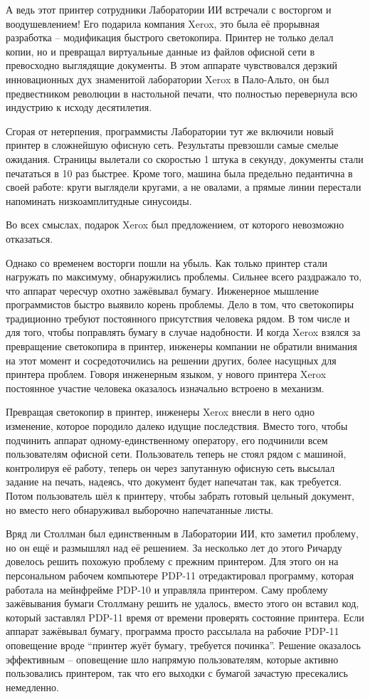 А ведь этот принтер сотрудники Лаборатории ИИ встречали с восторгом и воодушевлением! Его подарила компания Xerox, это была её прорывная разработка -- модификация быстрого светокопира. Принтер не только делал копии, но и превращал виртуальные данные из файлов офисной сети в превосходно выглядящие документы. В этом аппарате чувствовался дерзкий инновационных дух знаменитой лаборатории Xerox в Пало-Альто, он был предвестником революции в настольной печати, что полностью перевернула всю индустрию к исходу десятилетия.

Сгорая от нетерпения, программисты Лаборатории тут же включили новый принтер в сложнейшую офисную сеть. Результаты превзошли самые смелые ожидания. Страницы вылетали со скоростью 1 штука в секунду, документы стали печататься в 10 раз быстрее. Кроме того, машина была предельно педантична в своей работе: круги выглядели кругами, а не овалами, а прямые линии перестали напоминать низкоамплитудные синусоиды.

Во всех смыслах, подарок Xerox был предложением, от которого невозможно отказаться.

Однако со временем восторги пошли на убыль. Как только принтер стали нагружать по максимуму, обнаружились проблемы. Сильнее всего раздражало то, что аппарат чересчур охотно зажёвывал бумагу. Инженерное мышление программистов быстро выявило корень проблемы. Дело в том, что светокопиры традиционно требуют постоянного присутствия человека рядом. В том числе и для того, чтобы поправлять бумагу в случае надобности. И когда Xerox взялся за превращение светокопира в принтер, инженеры компании не обратили внимания на этот момент и сосредоточились на решении других, более насущных для принтера проблем. Говоря инженерным языком, у нового принтера Xerox постоянное участие человека оказалось изначально встроено в механизм.

Превращая светокопир в принтер, инженеры Xerox внесли в него одно изменение, которое породило далеко идущие последствия. Вместо того, чтобы подчинить аппарат одному-единственному оператору, его подчинили всем пользователям офисной сети. Пользователь теперь не стоял рядом с машиной, контролируя её работу, теперь он через запутанную офисную сеть высылал задание на печать, надеясь, что документ будет напечатан так, как требуется. Потом пользователь шёл к принтеру, чтобы забрать готовый цельный документ, но вместо него обнаруживал выборочно напечатанные листы.

Вряд ли Столлман был единственным в Лаборатории ИИ, кто заметил проблему, но он ещё и размышлял над её решением. За несколько лет до этого Ричарду довелось решить похожую проблему с прежним принтером. Для этого он на персональном рабочем компьютере PDP-11 отредактировал программу, которая работала на мейнфрейме PDP-10 и управляла принтером. Саму проблему зажёвывания бумаги Столлману решить не удалось, вместо этого он вставил код, который заставлял PDP-11 время от времени проверять состояние принтера. Если аппарат зажёвывал бумагу, программа просто рассылала на рабочие PDP-11 оповещение вроде ``принтер жуёт бумагу, требуется починка''. Решение оказалось эффективным -- оповещение шло напрямую пользователям, которые активно пользовались принтером, так что его выходки с бумагой зачастую пресекались немедленно.

